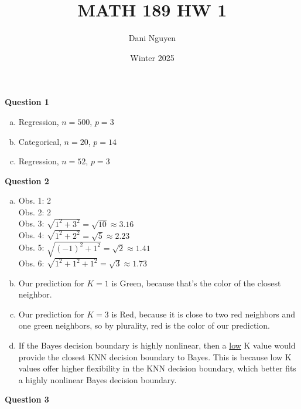 \documentclass[12pt, letterpaper]{article}
\title{MATH 189 HW 1}
\author{Dani Nguyen}
\date{Winter 2025}
\begin{document}
\maketitle
\graphicspath{ {./} }

\noindent \textbf{Question 1}
\begin{enumerate}[a.]
    \item Regression, $n = 500$, $p = 3$
    \item Categorical, $n =20$, $p = 14$
    \item Regression, $n = 52$, $p = 3$
\end{enumerate}

\noindent \textbf{Question 2}
\begin{enumerate}[a.]
    \item Obs. 1: 2 \\
          Obs. 2: 2 \\
          Obs. 3: $\sqrt{1^2+3^2} = \sqrt{10} \approx 3.16$ \\
          Obs. 4: $\sqrt{1^2+2^2} = \sqrt{5} \approx 2.23$ \\
          Obs. 5: $\sqrt{(-1)^2 + 1^2} = \sqrt{2} \approx 1.41$ \\
          Obs. 6: $\sqrt{1^2+1^2+1^2} = \sqrt{3} \approx 1.73$ 
    \item Our prediction for $K=1$ is Green, because that's the color of the closest neighbor.
    \item Our prediction for $K=3$ is Red, because it is close to two red neighbors and one green neighbors,
    so by plurality, red is the color of our prediction.
    \item If the Bayes decision boundary is highly nonlinear, then a \underline{low} K value would provide 
    the closest KNN decision boundary to Bayes. This is because low K values offer higher flexibility in the 
    KNN decision boundary, which better fits a highly nonlinear Bayes decision boundary.
\end{enumerate}
\newpage
\noindent \textbf{Question 3}
\end{document}
